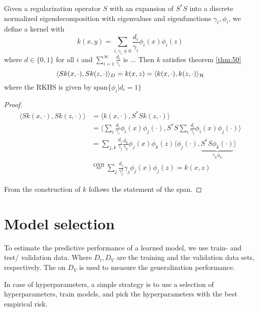 \begin{theorem}\label{thm:51}
    Given a regularization operator $S$ with an expansion of $S^*S$ into a 
    discrete normalized eigendecomposition with eigenvalues and eigenfunctions $ \gamma_i,\phi_i$, we define
    a kernel with 
    \[k(x,y)=\sum_{i,\gamma_i\neq 0}\frac{d_i}{\gamma_i}\phi_i(x)\phi_i(z)\] 
    where $d\in\{0,1\}$ for all $i$ and $\sum_{i=1}^\infty\frac{d_i}{\gamma_i}$ is ... %
    Then $k$ satisfies theorem \ref{thm:50}
    \[\langle Sk(x,\cdot),Sk(z,\cdot)\rangle_D=k(x,z)=\langle k(x,\cdot),k(z,\cdot)\rangle_{\mathcal{H}}\]
    where the RKHS is given by $\text{span}\{\phi_i|d_i=1\}$
\end{theorem}


\begin{proof}
    \begin{align*}
        \langle Sk(x,\cdot),Sk(z,\cdot)\rangle &=\langle k(x,\cdot),S^*Sk(z,\cdot)\rangle\\
        &=\langle\sum_i \frac{d_i}{\gamma_i}\phi_i(x)\phi_j(\cdot),S^*S\sum_i \frac{d_i}{\gamma_i}\phi_i(x)\phi_j(\cdot)\rangle\\
        &=\sum_{j,k}\frac{d_j}{\gamma_j}\frac{d_k}{\gamma_k}\phi_j(x)\phi_k(z)\langle \phi_j(\cdot),\underbrace{S^*S\phi_k(\cdot)}_{\gamma_k\phi_k}\rangle\\
        &\stackrel{\text{ONB}}{=}\sum_{j}\frac{d_j}{\gamma_j^2}\gamma_j\phi_j(x)\phi_j(z)=k(x,z)
    \end{align*}

    From the construction of $k$ follows the statement of the span.
\end{proof}


\section{Model selection}

To estimate the predictive performance of a learned model, we use train- and test/ validation data.
Where $D_t,D_V$ are the training and the validation data sets, respectively. 
The  on $D_V$ is used to measure the generalization performance.

In case of hyperparameters, a simple strategy is to use a selection of hyperparameters, train models, and 
pick the hyperparameters with the best empirical risk.

